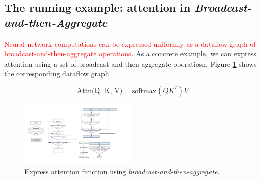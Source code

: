 \subsection{The running example: attention in \textit{Broadcast-and-then-Aggregate}}

\textcolor{red}{Neural network computations can be expressed uniformly as a dataflow graph of broadcast-and-then-aggregate operations}.
As a concrete example, we can express attention using a set of {broadcast-and-then-aggregate} operatiosn. Figure \ref{attn} shows the corresponding dataflow graph.

\begin{equation}
\text{Attn(Q, K, V)}=\text{softmax}(QK^T)V \label{eq::attn}
\end{equation}

\begin{figure}[h]
  \centering
  \includegraphics[width=0.5\textwidth]{figures/attention_expression_tree1.pdf}
  \caption{Express attention function using \textit{broadcast-and-then-aggregate}.}\label{attn}
\end{figure}